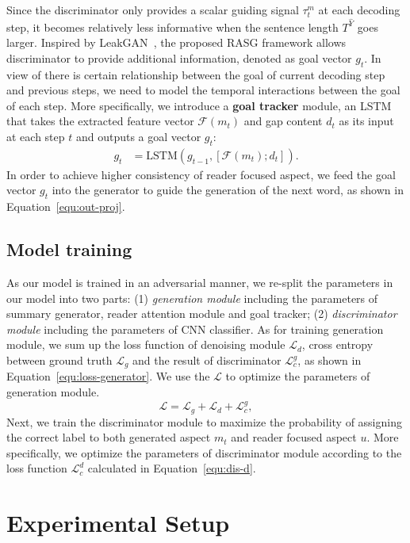 \documentclass[letterpaper]{article} \usepackage{aaai19}  \usepackage{times}  \usepackage{helvet}  \usepackage{courier}
\begin{document}
Since the discriminator only provides a scalar guiding signal $\tau^m_t$ at each decoding step, it becomes relatively less informative when the sentence length $T^{\hat{Y}}$ goes larger. 
Inspired by LeakGAN~\cite{Guo2018LongTG}, the proposed RASG framework allows discriminator to provide additional information, denoted as goal vector $g_t$.
In view of there is certain relationship between the goal of current decoding step and previous steps, we need to model the temporal interactions between the goal of each step.
More specifically, we introduce a \textbf{goal tracker} module, an LSTM that takes the extracted feature vector $\mathcal{F}(m_t)$ and gap content $d_t$ as its input at each step $t$ and outputs a goal vector $g_t$:
\begin{align}
    g_t &= \text{LSTM} (g_{t-1}, [\mathcal{F}(m_t); d_t]) .
\end{align}
In order to achieve higher consistency of reader focused aspect, we feed the goal vector $g_t$ into the generator to guide the generation of the next word, as shown in Equation~\ref{equ:out-proj}.

\subsection{Model training}

As our model is trained in an adversarial manner, we re-split the parameters in our model into two parts: (1) \textit{generation module} including the parameters of summary generator, reader attention module and goal tracker; (2) \textit{discriminator module} including the parameters of CNN classifier.
As for training generation module, we sum up the loss function of denoising module $\mathcal{L}_d$, cross entropy between ground truth $\mathcal{L}_g$ and the result of discriminator $\mathcal{L}^g_c$, as shown in Equation~\ref{equ:loss-generator}.
We use the $\mathcal{L}$ to optimize the parameters of generation module.
\begin{equation}
    \mathcal{L} = \mathcal{L}_g + \mathcal{L}_d + \mathcal{L}^g_c , \label{equ:loss-generator}
\end{equation}
Next, we train the discriminator module to maximize the probability of assigning the correct label to both generated aspect $m_t$ and reader focused aspect $u$.
More specifically, we optimize the parameters of discriminator module according to the loss function $\mathcal{L}^d_c$ calculated in Equation~\ref{equ:dis-d}.

\section{Experimental Setup}
\end{document}
